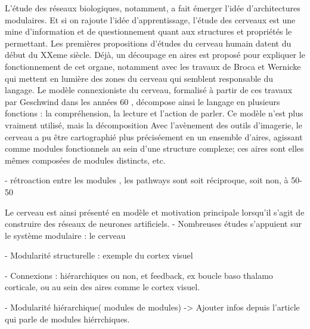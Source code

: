 L'étude des réseaux biologiques, notamment, a fait émerger l'idée d'architectures modulaires. Et si on rajoute l'idée d'apprentissage, l'étude des cerveaux est une mine d'information et de questionnement quant aux structures et propriétés le permettant. 
Les premières propositions d'études du cerveau humain datent du début du XXeme siècle. Déjà, un découpage en aires est proposé pour expliquer le fonctionnement de cet organe, notamment avec les travaux de Broca et Wernicke qui mettent en lumière des zones du cerveau qui semblent responsable du langage. Le modèle connexioniste du cerveau, formalisé à partir de ces travaux par Geschwind dans les années 60 , décompose ainsi le langage en plusieurs fonctions : la compréhension, la lecture et l'action de parler. Ce modèle n'est plus vraiment utilisé, mais la décomposition 
Avec l'avènement des outils d'imagerie, le cerveau a pu être cartographié plus préciséement en un ensemble d'aires, agissant comme modules fonctionnels au sein d'une structure complexe; ces aires sont elles mêmes composées de modules distincts, etc. 

- rétroaction entre les modules \cite{primate_cortex_91}, les pathways sont soit réciproque, soit non, à 50-50

Le cerveau est ainsi présenté en modèle et motivation principale lorsqu'il s'agit de construire des réseaux de neurones artificiels. 
- Nombreuses études s'appuient sur le système modulaire : le cerveau \cite{primate_cortex_91,mountcastle_columnar_1997,binzegger05}

- Modularité structurelle : exemple du cortex visuel

- Connexions : hiérarchiques ou non, et feedback, ex boucle baso thalamo corticale, ou au sein des aires comme le cortex visuel.

- Modularité hiérarchique( modules de modules) -> Ajouter infos depuis l'article qui parle de modules hiérrchiques. 


